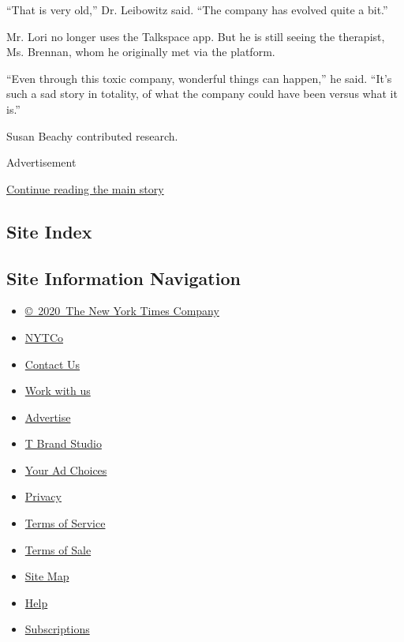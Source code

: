 ``That is very old,'' Dr. Leibowitz said. ``The company has evolved
quite a bit.''

Mr. Lori no longer uses the Talkspace app. But he is still seeing the
therapist, Ms. Brennan, whom he originally met via the platform.

``Even through this toxic company, wonderful things can happen,'' he
said. ``It's such a sad story in totality, of what the company could
have been versus what it is.''

Susan Beachy contributed research.

Advertisement

\protect\hyperlink{after-bottom}{Continue reading the main story}

\hypertarget{site-index}{%
\subsection{Site Index}\label{site-index}}

\hypertarget{site-information-navigation}{%
\subsection{Site Information
Navigation}\label{site-information-navigation}}

\begin{itemize}
\tightlist
\item
  \href{https://help.nytimes3xbfgragh.onion/hc/en-us/articles/115014792127-Copyright-notice}{©~2020~The
  New York Times Company}
\end{itemize}

\begin{itemize}
\tightlist
\item
  \href{https://www.nytco.com/}{NYTCo}
\item
  \href{https://help.nytimes3xbfgragh.onion/hc/en-us/articles/115015385887-Contact-Us}{Contact
  Us}
\item
  \href{https://www.nytco.com/careers/}{Work with us}
\item
  \href{https://nytmediakit.com/}{Advertise}
\item
  \href{http://www.tbrandstudio.com/}{T Brand Studio}
\item
  \href{https://www.nytimes3xbfgragh.onion/privacy/cookie-policy\#how-do-i-manage-trackers}{Your
  Ad Choices}
\item
  \href{https://www.nytimes3xbfgragh.onion/privacy}{Privacy}
\item
  \href{https://help.nytimes3xbfgragh.onion/hc/en-us/articles/115014893428-Terms-of-service}{Terms
  of Service}
\item
  \href{https://help.nytimes3xbfgragh.onion/hc/en-us/articles/115014893968-Terms-of-sale}{Terms
  of Sale}
\item
  \href{https://spiderbites.nytimes3xbfgragh.onion}{Site Map}
\item
  \href{https://help.nytimes3xbfgragh.onion/hc/en-us}{Help}
\item
  \href{https://www.nytimes3xbfgragh.onion/subscription?campaignId=37WXW}{Subscriptions}
\end{itemize}
